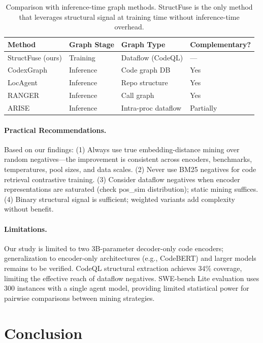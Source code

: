 \documentclass[11pt]{article}
\begin{document}
\begin{table}[h]
\centering
\caption{Comparison with inference-time graph methods. StructFuse is the only method that leverages structural signal at training time without inference-time overhead.}
\label{tab:lit_comparison}
\begin{tabular}{llll}
\toprule
\textbf{Method} & \textbf{Graph Stage} & \textbf{Graph Type} & \textbf{Complementary?} \\
\midrule
StructFuse (ours) & Training & Dataflow (CodeQL) & --- \\
CodexGraph & Inference & Code graph DB & Yes \\
LocAgent & Inference & Repo structure & Yes \\
RANGER & Inference & Call graph & Yes \\
ARISE & Inference & Intra-proc dataflow & Partially \\
\bottomrule
\end{tabular}
\end{table}

\paragraph{Practical Recommendations.}
Based on our findings: (1) Always use true embedding-distance mining over random negatives---the improvement is consistent across encoders, benchmarks, temperatures, pool sizes, and data scales. (2) Never use BM25 negatives for code retrieval contrastive training. (3) Consider dataflow negatives when encoder representations are saturated (check pos\_sim distribution); static mining suffices. (4) Binary structural signal is sufficient; weighted variants add complexity without benefit.

\paragraph{Limitations.}
Our study is limited to two 3B-parameter decoder-only code encoders; generalization to encoder-only architectures (e.g., CodeBERT) and larger models remains to be verified.
CodeQL structural extraction achieves 34\% coverage, limiting the effective reach of dataflow negatives.
SWE-bench Lite evaluation uses 300 instances with a single agent model, providing limited statistical power for pairwise comparisons between mining strategies.

\section{Conclusion}
\label{sec:conclusion}
\end{document}
